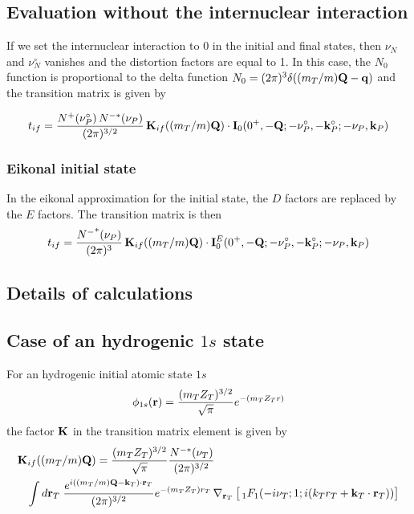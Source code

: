 \subsection{Evaluation without the internuclear interaction}

If we set the internuclear interaction to 0 in the initial and final
states, then $\nu_{N}$ and $\nu_{N}^{\circ}$ vanishes and the distortion
factors are equal to 1. In this case, the $N_{0}$ function is
proportional to the delta function $N_{0}= (2 \pi)^{3}
\delta((m_{T}/m)\mathbf{Q} - \mathbf{q})$ and the transition matrix is given by

\begin{equation}\label{Q:tif-noN}
t_{if} = \frac{N^{+}(\nu_{P}^{\circ})\,N^{-*}(\nu_{P})}{(2 \pi)^{3/2}}\,
\mathbf{K}_{if}((m_{T}/m)\mathbf{Q})  \cdot \mathbf{I}_{0}( 0^{+} , -\mathbf{Q};
-\nu_{P}^{\circ}, -\mathbf{k}_{P}^{\circ};-\nu_{P},\mathbf{k}_{P})
\end{equation}

\subsubsection*{Eikonal initial state}

In the eikonal approximation for the initial state, the $D$ factors are
replaced by the $E$ factors. The transition matrix is then
\begin{equation}\label{Q:tif-eis}
t_{if} = \frac{{N^{-}}^{*}(\nu_{P})}{(2 \pi)^{3}}\,
\mathbf{K}_{if}((m_{T}/m)\mathbf{Q}) \cdot \mathbf{I}^{E}_{0}( 0^{+} , -\mathbf{Q};
-\nu_{P}^{\circ}, -\mathbf{k}_{P}^{\circ};-\nu_{P},\mathbf{k}_{P})
\end{equation}

\subsection{Details of calculations}

\subsection*{Case of an hydrogenic $1s$ state}
For an hydrogenic initial atomic state $1s$
\[
\phi_{1s}(\mathbf{r}) = \frac{(m_{T} Z_{T})^{3/2}}{\sqrt{\pi}}
e^{-(m_{T} Z_{T} r)}
\]
%
the factor $\mathbf{K}$ in the transition matrix element is given by
\begin{eqnarray*}
\lefteqn{\vect{K}_{if}((m_{T}/m)\vect{Q}) = \frac{(m_{T}
Z_{T})^{3/2}}{\sqrt{\pi}} \frac{N^{-*}(\nu_{T})}{(2 \pi)^{3/2}}} \\
&&  \int d \vect{r}_{T} \; \frac{e^{i ((m_{T}/m)\vect{Q} -
\vect{k}_{T}) \cdot \vect{r}_{T}}}{(2 \pi)^{3/2}} e^{-
(m_{T}Z_{T})r_{T}}\, \nabla_{\vect{r}_{T}} \left[\,{_{1}F_{1}}( -i
\nu_{T}; 1; i(k_{T} r_{T} + \vect{k}_{T} \cdot \vect{r}_{T}) ) \vstretch
\right]
\end{eqnarray*}

